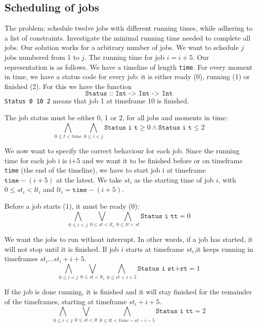 \documentclass[12pt]{article}
\begin{document}
\subsection*{Scheduling of jobs}
The problem: schedule twelve jobs with different running times, while adhering to a list of constraints. Investigate the minimal running time needed to complete all jobs.
Our solution works for a arbitrary number of jobs. We want to schedule $j$ jobs numbered from 1 to $j$. The running time for job $i = i+5$.
Our representation is as follows. We have a timeline of length \texttt{time}. For every moment in time, we have a status code for every job: it is either ready (0), running (1) or finished (2). 
For this we have the function 
\[\texttt{Status :: Int -> Int -> Int}\]
\texttt{Status 0 10 2} means that job 1 at timeframe 10 is finished. 

The job status must be either 0, 1 or 2, for all jobs and moments in time:
\[ \bigwedge_{0 \le t < time} \bigwedge_{0 \le i < j} \texttt{Status i t} \ge 0\wedge \texttt{Status i t} \le 2\]

We now want to specify the correct behaviour for each job. 
Since the running time for each job i is i+5 and we want it to be finished before or on timeframe \texttt{time} (the end of the timeline), we have to start job i at timeframe $\texttt{time}-(i+5)$ at the latest.
We take $st_i$ as the starting time of job $i$, with $0 \le st_i < lt_i$ and $lt_i = \texttt{time}-(i+5)$.

Before a job starts (1), it must be ready (0):
\[ \bigwedge_{0 \le i < j} \bigvee_{0 \le st < lt_i} \bigwedge_{0 \le tt < st} \texttt{Status i tt} = 0 \]

We want the jobs to run without interrupt.
In other words, if a job has started, it will not stop until it is finished. 
If job $i$ starts at timeframe $st_i$,it keeps running in timeframes $st_i \dots st_i + i + 5$.
\[ \bigwedge_{0 \le i < j} \bigvee_{0 \le st < lt_i} \bigwedge_{0 \le rt < i+5} \texttt{Status i st+rt} = 1 \]

If the job is done running, it is finished and it will stay finished for the remainder of the timeframes, starting at timeframe $st_i + i + 5$.
\[ \bigwedge_{0 \le i < j} \bigvee_{0 \le st < lt} \bigwedge_{0 \le tt < time-st-i-5} \texttt{Status i tt} = 2 \]

\begin{comment}
If we put these three conditions together, we get:
$\bigwedge_{0 \le i < j} \bigvee_{0 \le st < lt_i} 
\left( 
\bigwedge_{0 \le tt < st} \texttt{Status i tt} = 0 \wedge \\
\bigwedge_{0 \le tt < i+5} \texttt{Status i st+tt} = 1 \wedge \\
\bigwedge_{0 \le tt < time-st-i-5} \texttt{Status i tt} = 2
\right)
$
\end{comment}
\end{document}
